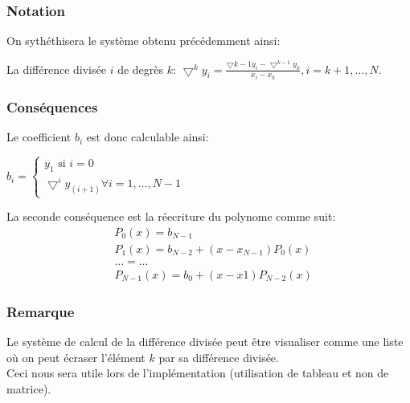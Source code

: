 \subsubsection{Notation}
On sythéthisera le système obtenu précédemment ainsi: \\
\begin{center}
La différence divisée $i$ de degrès $k$: $\bigtriangledown^{k}y_i = \frac{\bigtriangledown{k-1}y_i -\bigtriangledown^{k-1}y_k}{x_i - x_k}, i= k+1, \ldots, N.  $
\end{center}
\subsubsection{Conséquences}
Le coefficient $b_i$ est donc calculable ainsi:
\begin{center}
$b_i =
\begin{cases}
y_1 \text{ si } i=0  \\
\bigtriangledown^{i}y_{(i+1)} \forall i = 1,\ldots, N-1
\end{cases}
$
\end{center}
La seconde conséquence est la réecriture du polynome comme suit:\\
\begin{align*}
&P_0(x) = b_{N-1} \\
&P_1(x) = b_{N-2} + (x-x_{N-1})P_0(x) \\
&\ldots = \ldots \\
&P_{N-1}(x) = b_0 + (x-x1)P_{N-2}(x)
\end{align*}
\subsubsection{Remarque}
Le système de calcul de la différence divisée peut être visualiser comme une liste où on peut écraser l'élément $k$ par sa différence divisée.\\
Ceci nous sera utile lors de l'implémentation (utilisation de tableau et non de matrice).
\newpage
